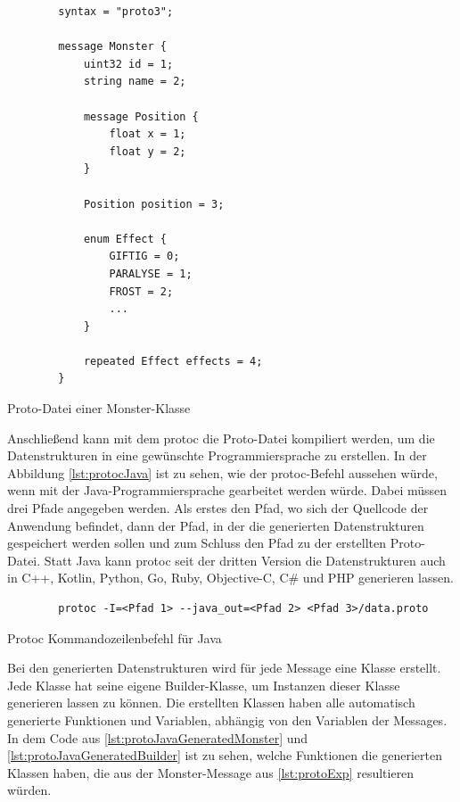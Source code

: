 \begin{listing}[htp]
    \begin{verbatim} 
        syntax = "proto3";
        
        message Monster {
            uint32 id = 1;
            string name = 2;

            message Position {
                float x = 1;
                float y = 2;
            }

            Position position = 3;

            enum Effect {
                GIFTIG = 0;
                PARALYSE = 1;
                FROST = 2;
                ...
            }

            repeated Effect effects = 4;
        }
    \end{verbatim}
    \caption{Proto-Datei einer Monster-Klasse}
    \label{lst:protoExp}
\end{listing}

Anschließend kann mit dem \ac{protoc} die Proto-Datei kompiliert werden, um die Datenstrukturen in eine gewünschte Programmiersprache zu erstellen. In der Abbildung \ref{lst:protocJava} ist zu sehen, wie der \ac{protoc}-Befehl aussehen würde, wenn mit der Java-Programmiersprache gearbeitet werden würde. Dabei müssen drei Pfade angegeben werden. Als erstes den Pfad, wo sich der Quellcode der Anwendung befindet, dann der Pfad, in der die generierten Datenstrukturen gespeichert werden sollen und zum Schluss den Pfad zu der erstellten Proto-Datei. Statt Java kann \ac{protoc} seit der dritten Version die Datenstrukturen auch in C++, Kotlin, Python, Go, Ruby, Objective-C, C\# und PHP generieren lassen.\cite{protobufLanguageGuide}\cite{protobufProtocolBufferJava}

\begin{listing}[htp]
    \begin{verbatim} 
        protoc -I=<Pfad 1> --java_out=<Pfad 2> <Pfad 3>/data.proto
    \end{verbatim}
    \caption{Protoc Kommandozeilenbefehl für Java\cite{protobufProtocolBufferJava}}
    \label{lst:protocJava}
\end{listing}

Bei den generierten Datenstrukturen wird für jede Message eine Klasse erstellt. Jede Klasse hat seine eigene Builder-Klasse, um Instanzen dieser Klasse generieren lassen zu können. Die erstellten Klassen haben alle automatisch generierte Funktionen und Variablen, abhängig von den Variablen der Messages. In dem Code aus \ref{lst:protoJavaGeneratedMonster} und \ref{lst:protoJavaGeneratedBuilder} ist zu sehen, welche Funktionen die generierten Klassen haben, die aus der Monster-Message aus \ref{lst:protoExp} resultieren würden. 

